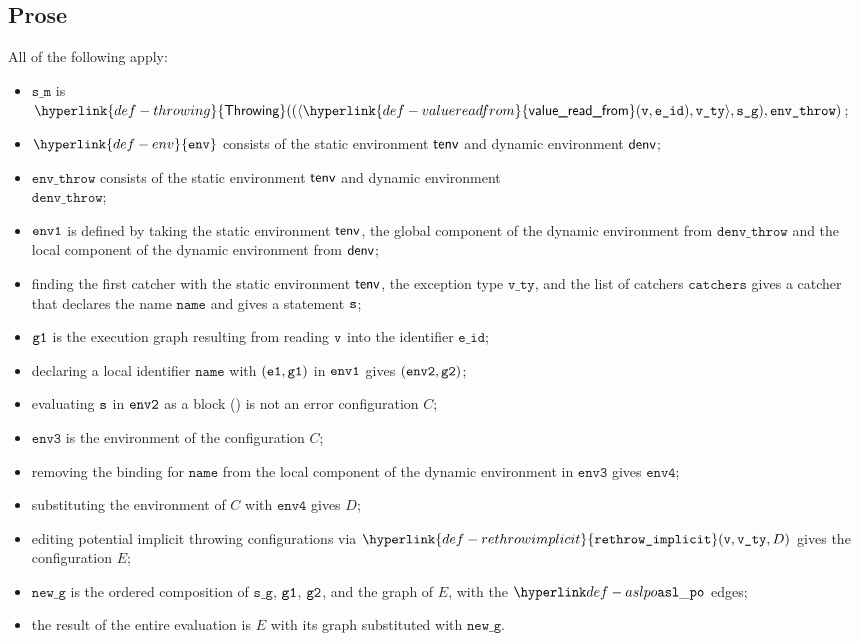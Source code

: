 \documentclass{book}
\newcommand\ErrorConfig[0]{\hyperlink{def-errorconfig}{\texttt{\#DE}}}
\newcommand\ProseOrError[0]{\ProseTerminateAs{\ErrorConfig}}
\newcommand\rethrowimplicit[0]{\hyperlink{def-rethrowimplicit}{\texttt{rethrow\_implicit}}}
\newcommand\valuereadfrom[0]{\hyperlink{def-valuereadfrom}{\textsf{value\_read\_from}}}
\newcommand\Throwing[0]{\hyperlink{def-throwing}{\textsf{Throwing}}}
\newcommand\env[0]{\hyperlink{def-env}{\texttt{env}}}
\newcommand\envthree[0]{\texttt{env3}}
\newcommand\envfour[0]{\texttt{env4}}
\newcommand\newg[0]{\texttt{new\_g}}
\newcommand\veone[0]{\texttt{e1}}
\newcommand\name[0]{\texttt{name}}
\newcommand\catchers[0]{\texttt{catchers}}
\newcommand\envthrow[0]{\texttt{env\_throw}}
\newcommand\denvthrow[0]{\texttt{denv\_throw}}
\newcommand\sm[0]{\texttt{s\_m}}
\newcommand\sg[0]{\texttt{s\_g}}
\newcommand\vvty[0]{\texttt{v\_ty}}
\newcommand\eid[0]{\texttt{e\_id}}
\begin{document}
  \subsection{Prose}
  All of the following apply:
  \begin{itemize}
    \item $\sm$ is $\Throwing((\langle \valuereadfrom(\vv, \eid), \vvty \rangle, \sg), \envthrow)$;
    \item $\env$ consists of the static environment $\textsf{tenv}$ and dynamic environment $\textsf{denv}$;
    \item $\envthrow$ consists of the static environment $\textsf{tenv}$ and dynamic environment \\ $\denvthrow$;
    \item $\texttt{env1}$ is defined by taking the static environment $\textsf{tenv}$, the global component of the dynamic
    environment from $\denvthrow$ and the local component of the dynamic environment from $\textsf{denv}$;
    \item finding the first catcher with the static environment $\textsf{tenv}$, the exception type $\vvty$,
    and the list of catchers $\catchers$ gives a catcher that declares the name $\name$ and gives a statement $\texttt{s}$;
    \item $\texttt{g1}$ is the execution graph resulting from reading $\texttt{v}$ into the identifier $\eid$;
    \item declaring a local identifier $\name$ with $(\veone, \vgone)$ in $\texttt{env1}$ gives $(\texttt{env2}, \texttt{g2})$;
    \item evaluating $\texttt{s}$ in $\texttt{env2}$ as a block () is not an error
    configuration $C$\ProseOrError;
    \item $\envthree$ is the environment of the configuration $C$;
    \item removing the binding for $\name$ from the local component of the dynamic environment in $\envthree$
    gives $\envfour$;
    \item substituting the environment of $C$ with $\envfour$ gives $D$;
    \item editing potential implicit throwing configurations via $\rethrowimplicit(\vv, \vvty, D)$
    gives the configuration $E$;
    \item $\newg$ is the ordered composition of $\sg$, $\texttt{g1}$, $\texttt{g2}$, and the graph of $E$,
    with the $\aslpo$ edges;
    \item the result of the entire evaluation is $E$ with its graph substituted with $\newg$.
  \end{itemize}
\end{document}
